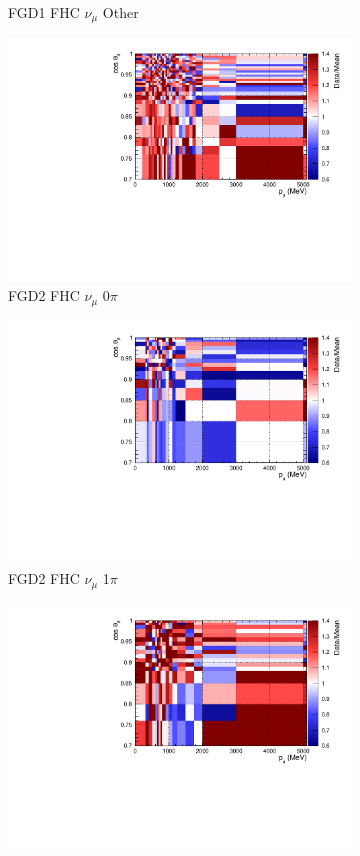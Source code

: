 \begin{figure}
\begin{subfigure}{.32\textwidth}
  \caption{FGD1 FHC $\nu_{\mu}$ Other}
  \label{fig:priorpred_FGD1_numuCC_other}
\end{subfigure}
\centering
\begin{subfigure}{.32\textwidth}
  \centering
  \includegraphics[width=0.85\linewidth]{figs/priorpred_FGD2_numuCC_0pi.pdf}
  \caption{FGD2 FHC $\nu_{\mu}$ 0$\pi$}
  \label{fig:priorpred_FGD2_numuCC_0pi}
\end{subfigure}
\begin{subfigure}{.32\textwidth}
  \centering
  \includegraphics[width=0.85\linewidth]{figs/priorpred_FGD2_numuCC_1pi.pdf}
  \caption{FGD2 FHC $\nu_{\mu}$ 1$\pi$}
  \label{fig:priorpred_FGD2_numuCC_1pi}
\end{subfigure}
\begin{subfigure}{.32\textwidth}
  \centering
  \includegraphics[width=0.85\linewidth]{figs/priorpred_FGD2_numuCC_other.pdf}

\end{subfigure}
\end{figure}

